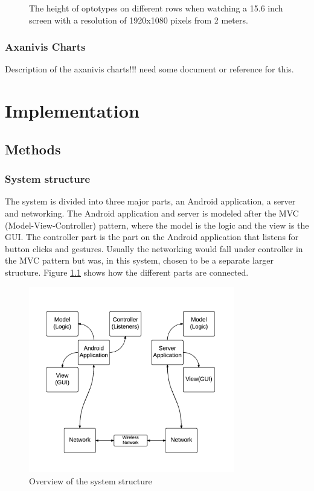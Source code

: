\documentclass[12pt,a4paper,notitlepage]{report}
\begin{document}
\begin{figure}[ht!]
\caption{The height of optotypes on different rows when watching a 15.6 inch screen with a resolution of 1920x1080 pixels from 2 meters.}
\end{figure}

\subsection{Axanivis Charts}
Description of the axanivis charts!!! need some document or reference for this.

\chapter{Implementation}
\section{Methods}
\subsection{System structure}
The system is divided into three major parts, an Android application, a server and networking. The Android application and server is modeled after the MVC (Model-View-Controller) pattern, where the model is the logic and the view is the GUI. The controller part is the part on the Android application that listens for button clicks and gestures. Usually the networking would fall under controller in the MVC pattern but was, in this system, chosen to be a separate larger structure. Figure \ref{system_structure} shows how the different parts are connected.

\begin{figure}[ht!]
\centering
\includegraphics[width=90mm]{images/system_structure.png}
\caption{Overview of the system structure\label{system_structure}}
\end{figure}
\end{document}
